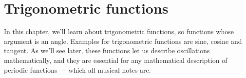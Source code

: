 \section{Trigonometric functions}

In this chapter, we'll learn about trigonometric functions, so functions whose argument is an angle. Examples for trigonometric functions are sine, cosine and tangent. As we'll see later, these functions let us describe oscillations mathematically, and they are essential for any mathematical description of periodic functions --- which all musical notes are.

